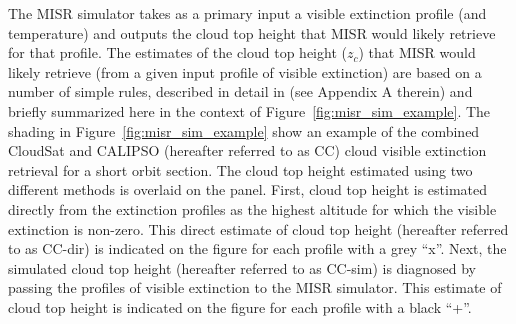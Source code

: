 The MISR simulator takes as a primary input a visible extinction profile
(and temperature) and outputs the cloud top height that MISR would
likely retrieve for that profile. The estimates of the cloud top height
(\(z_c\)) that MISR would likely retrieve (from a given input profile of
visible extinction) are based on a number of simple rules, described in
detail in \citet{marchand_and_ackerman_2010} (see Appendix A therein)
and briefly summarized here in the context of
Figure~\ref{fig:misr_sim_example}. The shading in
Figure~\ref{fig:misr_sim_example} show an example of the combined
CloudSat and CALIPSO (hereafter referred to as CC) cloud visible
extinction retrieval for a short orbit section. The cloud top height
estimated using two different methods is overlaid on the panel. First,
cloud top height is estimated directly from the extinction profiles as
the highest altitude for which the visible extinction is non-zero. This
direct estimate of cloud top height (hereafter referred to as CC-dir) is
indicated on the figure for each profile with a grey ``x''. Next, the
simulated cloud top height (hereafter referred to as CC-sim) is
diagnosed by passing the profiles of visible extinction to the MISR
simulator. This estimate of cloud top height is indicated on the figure
for each profile with a black ``+''.

